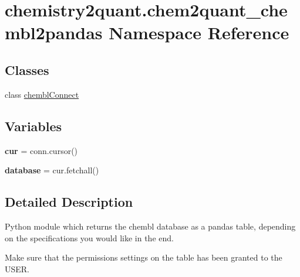 \hypertarget{namespacechemistry2quant_1_1chem2quant__chembl2pandas}{}\section{chemistry2quant.\+chem2quant\+\_\+chembl2pandas Namespace Reference}
\label{namespacechemistry2quant_1_1chem2quant__chembl2pandas}
\subsection*{Classes}
\begin{DoxyCompactItemize}
\item
class \hyperlink{classchemistry2quant_1_1chem2quant__chembl2pandas_1_1chemblConnect}{chembl\+Connect}
\end{DoxyCompactItemize}
\subsection*{Variables}
\begin{DoxyCompactItemize}
\item
\mbox{\label{namespacechemistry2quant_1_1chem2quant__chembl2pandas_aa33e2efbebcd46b5a9a14ed84b125b99}}
{\bfseries cur} = conn.\+cursor()
\item
\mbox{\label{namespacechemistry2quant_1_1chem2quant__chembl2pandas_ae989c108f66c6a5bace59eeb67d9bbc6}}
{\bfseries database} = cur.\+fetchall()
\end{DoxyCompactItemize}


\subsection{Detailed Description}
\begin{DoxyVerb}Python module which returns the chembl database as a pandas table, depending on the
specifications you would like in the end.

Make sure that the permissions settings on the table has been granted to the USER.
\end{DoxyVerb}
